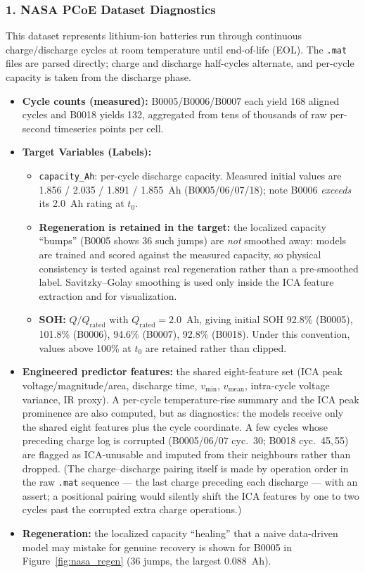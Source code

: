 \subsubsection{1. NASA PCoE Dataset Diagnostics}
This dataset represents lithium-ion batteries run through continuous
charge/discharge cycles at room temperature until end-of-life (EOL). The
\texttt{.mat} files are parsed directly; charge and discharge half-cycles
alternate, and per-cycle capacity is taken from the discharge phase.
\begin{itemize}
    \item \textbf{Cycle counts (measured):} B0005/B0006/B0007 each yield 168
    aligned cycles and B0018 yields 132, aggregated from tens of thousands of raw
    per-second timeseries points per cell.
    \item \textbf{Target Variables (Labels):}
    \begin{itemize}
        \item \texttt{capacity\_Ah}: per-cycle discharge capacity. Measured initial
        values are 1.856 / 2.035 / 1.891 / 1.855~Ah (B0005/06/07/18); note B0006
        \emph{exceeds} its 2.0~Ah rating at $t_0$.
        \item \textbf{Regeneration is retained in the target:} the localized
        capacity ``bumps'' (B0005 shows 36 such jumps) are \emph{not} smoothed
        away: models are trained and scored against the measured capacity, so
        physical consistency is tested against real regeneration rather than a
        pre-smoothed label. Savitzky--Golay smoothing is used only inside the
        ICA feature extraction and for visualization.
        \item \textbf{SOH:} $Q/Q_\text{rated}$ with $Q_\text{rated}=2.0$~Ah, giving
        initial SOH 92.8\% (B0005), 101.8\% (B0006), 94.6\% (B0007), 92.8\%
        (B0018). Under this convention, values above 100\% at $t_0$ are
        retained rather than clipped.
    \end{itemize}
    \item \textbf{Engineered predictor features:} the shared eight-feature set
    (ICA peak voltage/magnitude/area, discharge time, $v_\text{min}$,
    $v_\text{mean}$, intra-cycle voltage variance, IR proxy). A per-cycle
    temperature-rise summary and the ICA peak prominence are also computed, but
    as diagnostics: the models receive only the shared eight features plus the
    cycle coordinate. A few cycles whose preceding charge log is
    corrupted (B0005/06/07 cyc.~30; B0018 cyc.~45,\,55) are flagged as
    ICA-unusable and imputed from their neighbours rather than dropped. (The
    charge--discharge pairing itself is made by operation order in the raw
    \texttt{.mat} sequence --- the last charge preceding each discharge ---
    with an assert; a positional pairing would silently shift the ICA features
    by one to two cycles past the corrupted extra charge operations.)
    \item \textbf{Regeneration:} the localized capacity ``healing'' that a naive
    data-driven model may mistake for genuine recovery is shown for B0005 in
    Figure~\ref{fig:nasa_regen} (36 jumps, the largest 0.088~Ah).
\end{itemize}
